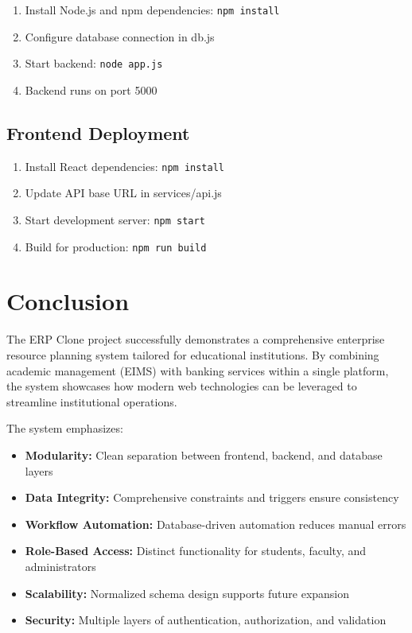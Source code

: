 \documentclass[12pt]{article}
\begin{document}
\begin{enumerate}
    \item Install Node.js and npm dependencies: \texttt{npm install}
    \item Configure database connection in db.js
    \item Start backend: \texttt{node app.js}
    \item Backend runs on port 5000
\end{enumerate}

\subsection{Frontend Deployment}

\begin{enumerate}
    \item Install React dependencies: \texttt{npm install}
    \item Update API base URL in services/api.js
    \item Start development server: \texttt{npm start}
    \item Build for production: \texttt{npm run build}
\end{enumerate}

\newpage

\section{Conclusion}

The ERP Clone project successfully demonstrates a comprehensive enterprise resource planning system tailored for educational institutions. By combining academic management (EIMS) with banking services within a single platform, the system showcases how modern web technologies can be leveraged to streamline institutional operations.

The system emphasizes:

\begin{itemize}
    \item \textbf{Modularity:} Clean separation between frontend, backend, and database layers
    \item \textbf{Data Integrity:} Comprehensive constraints and triggers ensure consistency
    \item \textbf{Workflow Automation:} Database-driven automation reduces manual errors
    \item \textbf{Role-Based Access:} Distinct functionality for students, faculty, and administrators
    \item \textbf{Scalability:} Normalized schema design supports future expansion
    \item \textbf{Security:} Multiple layers of authentication, authorization, and validation
\end{itemize}
\end{document}
